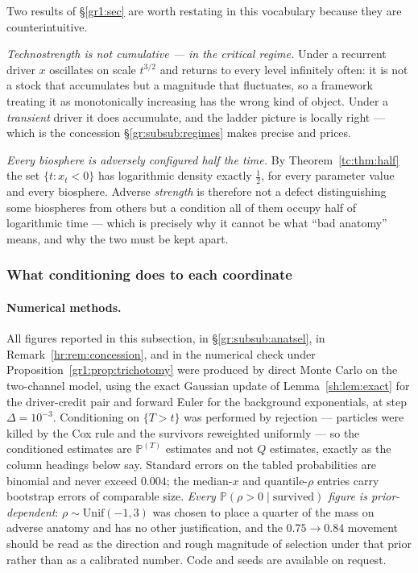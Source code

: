 \documentclass[11pt]{article}
\numberwithin{equation}{section}
\theoremstyle{plain}
\theoremstyle{definition}
\theoremstyle{remark}
\newcommand{\PP}{\mathbb{P}}
\begin{document}
Two results of \S\ref{gr1:sec} are worth restating in this vocabulary because
they are counterintuitive.

\emph{Technostrength is not cumulative --- in the critical regime.}
Under a recurrent driver $x$ oscillates on scale $t^{3/2}$ and returns
to every level infinitely often: it is not a stock that accumulates but
a magnitude that fluctuates, so a framework treating it as monotonically
increasing has the wrong kind of object. Under a \emph{transient} driver
it does accumulate, and the ladder picture is locally right --- which is
the concession \S\ref{gr:subsub:regimes} makes precise and prices.

\emph{Every biosphere is adversely configured half the time.} By
Theorem~\ref{tc:thm:half} the set $\{t:x_t<0\}$ has logarithmic density
exactly $\tfrac12$, for every parameter value and every biosphere.
Adverse \emph{strength} is therefore not a defect distinguishing some
biospheres from others but a condition all of them occupy half of
logarithmic time --- which is precisely why it cannot be what
``bad anatomy'' means, and why the two must be kept apart.

\subsubsection{What conditioning does to each coordinate}
\label{gr:subsub:measured}

\paragraph{Numerical methods.} All figures reported in this subsection,
in \S\ref{gr:subsub:anatsel}, in Remark~\ref{hr:rem:concession}, and in
the numerical check under Proposition~\ref{gr1:prop:trichotomy} were
produced by direct Monte Carlo on the two-channel model, using the exact
Gaussian update of Lemma~\ref{sh:lem:exact} for the driver-credit pair
and forward Euler for the background exponentials, at step
$\Delta=10^{-3}$. Conditioning on $\{T>t\}$ was performed by rejection
--- particles were killed by the Cox rule and the survivors reweighted
uniformly --- so the conditioned estimates are $\PP^{(T)}$ estimates and
not $Q$ estimates, exactly as the column headings below say. Standard
errors on the tabled probabilities are binomial and never exceed
$0.004$; the median-$x$ and quantile-$\rho$ entries carry bootstrap
errors of comparable size. \emph{Every $\PP(\rho>0\mid\text{survived})$
figure is prior-dependent}: $\rho\sim\mathrm{Unif}(-1,3)$ was chosen to
place a quarter of the mass on adverse anatomy and has no other
justification, and the $0.75\to0.84$ movement should be read as the
direction and rough magnitude of selection under that prior rather than
as a calibrated number. Code and seeds are available on request.
\end{document}
